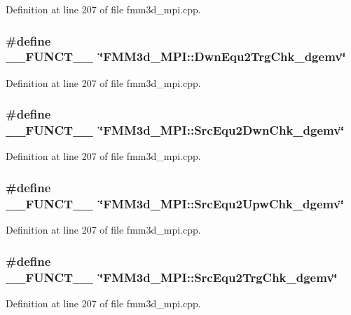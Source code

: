 Definition at line 207 of file fmm3d\_\-mpi.cpp.
\subsubsection{\setlength{\rightskip}{0pt plus 5cm}\#define \_\-\_\-FUNCT\_\-\_\-~\char`\"{}FMM3d\_\-MPI::Dwn\-Equ2Trg\-Chk\_\-dgemv\char`\"{}}\label{fmm3d__mpi_8cpp_2818853adf63a17949cf67d73c1d4473_2818853adf63a17949cf67d73c1d4473}




Definition at line 207 of file fmm3d\_\-mpi.cpp.
\subsubsection{\setlength{\rightskip}{0pt plus 5cm}\#define \_\-\_\-FUNCT\_\-\_\-~\char`\"{}FMM3d\_\-MPI::Src\-Equ2Dwn\-Chk\_\-dgemv\char`\"{}}\label{fmm3d__mpi_8cpp_2818853adf63a17949cf67d73c1d4473_2818853adf63a17949cf67d73c1d4473}




Definition at line 207 of file fmm3d\_\-mpi.cpp.
\subsubsection{\setlength{\rightskip}{0pt plus 5cm}\#define \_\-\_\-FUNCT\_\-\_\-~\char`\"{}FMM3d\_\-MPI::Src\-Equ2Upw\-Chk\_\-dgemv\char`\"{}}\label{fmm3d__mpi_8cpp_2818853adf63a17949cf67d73c1d4473_2818853adf63a17949cf67d73c1d4473}




Definition at line 207 of file fmm3d\_\-mpi.cpp.
\subsubsection{\setlength{\rightskip}{0pt plus 5cm}\#define \_\-\_\-FUNCT\_\-\_\-~\char`\"{}FMM3d\_\-MPI::Src\-Equ2Trg\-Chk\_\-dgemv\char`\"{}}\label{fmm3d__mpi_8cpp_2818853adf63a17949cf67d73c1d4473_2818853adf63a17949cf67d73c1d4473}




Definition at line 207 of file fmm3d\_\-mpi.cpp.